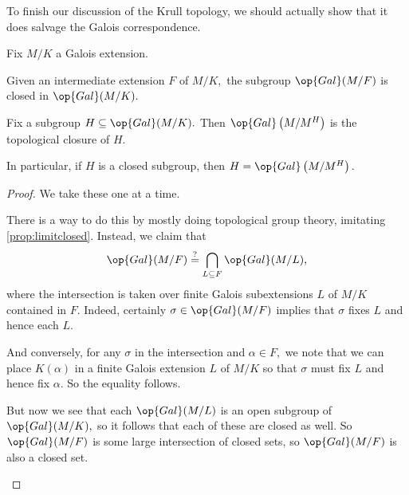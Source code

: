 \documentclass[../notes.tex]{subfiles}
\begin{document}
To finish our discussion of the Krull topology, we should actually show that it does salvage the Galois correspondence.
\begin{theorem}
	Fix $M/K$ a Galois extension.
	\begin{listalph}
		\item Given an intermediate extension $F$ of $M/K,$ the subgroup $\op{Gal}(M/F)$ is closed in $\op{Gal}(M/K).$
		\item Fix a subgroup $H\subseteq\op{Gal}(M/K).$ Then $\op{Gal}\left(M/M^H\right)$ is the topological closure of $H.$
		\item In particular, if $H$ is a closed subgroup, then $H=\op{Gal}\left(M/M^H\right).$
	\end{listalph}
\end{theorem}
\begin{proof}
	We take these one at a time.
	\begin{listalph}
		\item There is a way to do this by mostly doing topological group theory, imitating \autoref{prop:limitclosed}. Instead, we claim that
		\[\op{Gal}(M/F)\stackrel?=\bigcap_{L\subseteq F}\op{Gal}(M/L),\]
		where the intersection is taken over finite Galois subextensions $L$ of $M/K$ contained in $F.$ Indeed, certainly $\sigma\in\op{Gal}(M/F)$ implies that $\sigma$ fixes $L$ and hence each $L.$
		
		And conversely, for any $\sigma$ in the intersection and $\alpha\in F,$ we note that we can place $K(\alpha)$ in a finite Galois extension $L$ of $M/K$ so that $\sigma$ must fix $L$ and hence fix $\alpha.$ So the equality follows.

		But now we see that each $\op{Gal}(M/L)$ is an open subgroup of $\op{Gal}(M/K),$ so it follows that each of these are closed as well. So $\op{Gal}(M/F)$ is some large intersection of closed sets, so $\op{Gal}(M/F)$ is also a closed set.
		


\end{listalph}
\end{proof}
\end{document}
